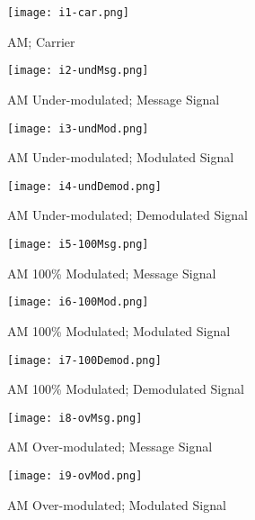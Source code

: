 \begin{figure}[H]
    \centering
    \texttt{[image: i1-car.png]}
    \caption{AM; Carrier}
    \label{fig:img1}
\end{figure}

\begin{figure}[H]
    \centering
    \texttt{[image: i2-undMsg.png]}
    \caption{AM Under-modulated; Message Signal}
    \label{fig:img2}
\end{figure}

\begin{figure}[H]
    \centering
    \texttt{[image: i3-undMod.png]}
    \caption{AM Under-modulated; Modulated Signal}
    \label{fig:img3}
\end{figure}

\begin{figure}[H]
    \centering
    \texttt{[image: i4-undDemod.png]}
    \caption{AM Under-modulated; Demodulated Signal}
    \label{fig:img4}
\end{figure}

\begin{figure}[H]
    \centering
    \texttt{[image: i5-100Msg.png]}
    \caption{AM 100\% Modulated; Message Signal}
    \label{fig:img5}
\end{figure}

\begin{figure}[H]
    \centering
    \texttt{[image: i6-100Mod.png]}
    \caption{AM 100\% Modulated; Modulated Signal}
    \label{fig:img6}
\end{figure}

\begin{figure}[H]
    \centering
    \texttt{[image: i7-100Demod.png]}
    \caption{AM 100\% Modulated; Demodulated Signal}
    \label{fig:img7}
\end{figure}

\begin{figure}[H]
    \centering
    \texttt{[image: i8-ovMsg.png]}
    \caption{AM Over-modulated; Message Signal}
    \label{fig:img8}
\end{figure}

\begin{figure}[H]
    \centering
    \texttt{[image: i9-ovMod.png]}
    \caption{AM Over-modulated; Modulated Signal}
    \label{fig:img9}
\end{figure}

